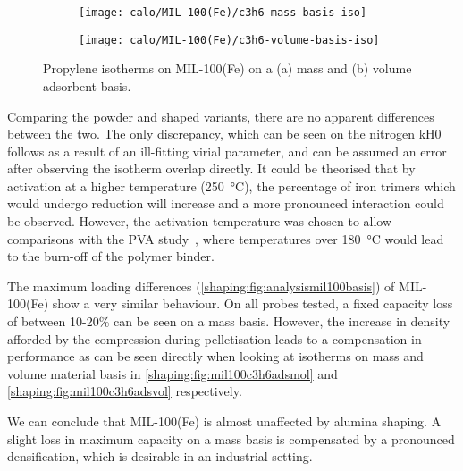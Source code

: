 \begin{figure}[htb]
	\centering
	\begin{subfigure}{0.45\textwidth}
		\texttt{[image: calo/MIL-100(Fe)/c3h6-mass-basis-iso]}
		\caption{}%
		\label{shaping:fig:mil100c3h6adsmol}
	\end{subfigure}%
	\begin{subfigure}{0.45\textwidth}
		\texttt{[image: calo/MIL-100(Fe)/c3h6-volume-basis-iso]}
		\caption{}%
		\label{shaping:fig:mil100c3h6adsvol}
	\end{subfigure}%
	\caption{Propylene isotherms on MIL-100(Fe) on a (a) mass
		and (b) volume adsorbent basis.}%
	\label{shaping:fig:mil100isotherms}
\end{figure}

Comparing the powder and shaped variants, there are no
apparent differences between the two. The only discrepancy,
which can be seen on the nitrogen \gls{kH0} follows
as a result of an ill-fitting virial parameter,
and can be assumed an error after observing the isotherm
overlap directly. It could be theorised that by activation at
a higher temperature (\SI{250}{\degreeCelsius}),
the percentage of iron trimers which would undergo reduction will
increase and a more pronounced interaction could be observed.
However, the activation temperature was chosen to allow
comparisons with the \gls{PVA} study~\cite{chanutObservingEffectsShaping2016},
where temperatures over \SI{180}{\degreeCelsius} would lead to the
burn-off of the polymer binder.

The maximum loading differences (\autoref{shaping:fig:analysismil100basis})
of MIL-100(Fe) show a very similar behaviour.
On all probes tested, a fixed capacity
loss of between 10-20\% can be seen on a mass
basis. However, the increase in density afforded by the
compression during pelletisation leads to a compensation in
performance as can be seen directly when looking at isotherms on mass and
volume material basis in \autoref{shaping:fig:mil100c3h6adsmol} and
\autoref{shaping:fig:mil100c3h6adsvol} respectively.

We can conclude that MIL-100(Fe) is almost unaffected by alumina shaping.
A slight loss in maximum capacity on a mass basis is compensated by a pronounced densification, which is desirable in an industrial setting.
